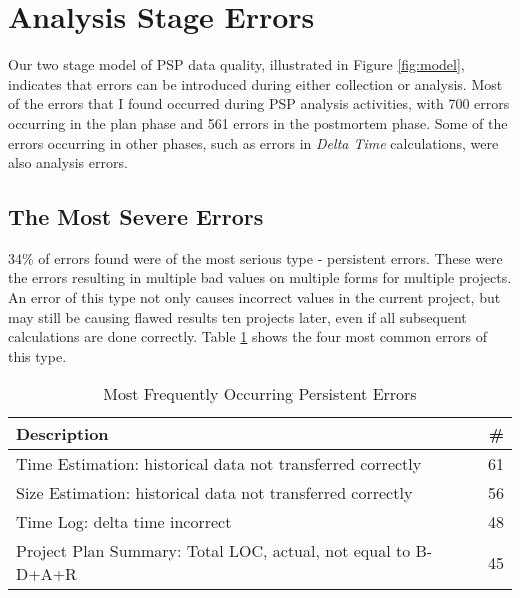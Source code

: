 \section{\label{section:Analysis}Analysis Stage Errors}
Our two stage model of PSP data quality, illustrated in Figure
\ref{fig:model}, indicates that errors can be introduced during either
collection or analysis.  Most of the errors that I found occurred during PSP
analysis activities, with 700 errors occurring in the plan phase and 561
errors in the postmortem phase.  Some of the errors occurring in other
phases, such as errors in {\it Delta Time} calculations, were also analysis
errors.

\subsection{\label{section:SevereErrors}The Most Severe Errors} 
34\% of errors found were of the most serious type - persistent 
errors.  These were the errors resulting in multiple bad values on 
multiple forms for multiple projects.  An error of this type not only causes  
incorrect values in the current project, but may still be causing flawed results 
ten projects later, even if all subsequent calculations are done correctly. 
Table \ref{table:errorsCommon} shows the four most common errors of this type.

\begin{table}[ht]
\begin{center}  
\caption{\label{table:errorsCommon} Most Frequently Occurring Persistent Errors}
\begin{tabular}{|l|r|}\hline 
Description & \# \\ \hline\hline 
Time Estimation: historical data not transferred correctly     & 61 \\ \hline 
Size Estimation: historical data not transferred correctly     & 56 \\ \hline 
Time Log: delta time incorrect                                 & 48 \\ \hline 
Project Plan Summary: Total LOC, actual, not equal to B-D+A+R  & 45 \\ \hline 
\end{tabular} 
\end{center} 
\end{table}


